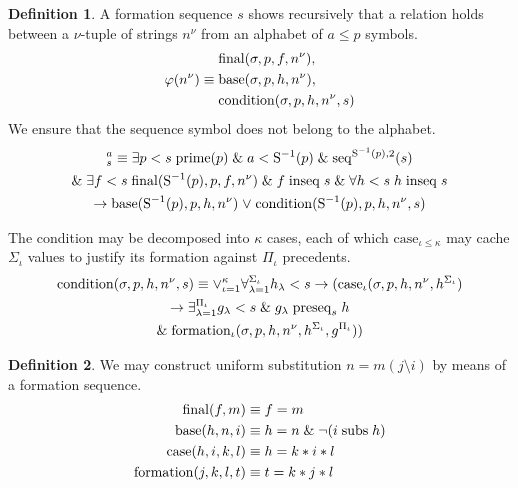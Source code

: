 \documentclass{amsbook}
\newcommand{\univ}[1]{\mathord\forall#1\;}
\newcommand{\exis}[1]{\mathord\exists#1\;}
\newcommand{\then}{\mathrel\rightarrow}
\newcommand{\conj}{\mathrel\&}
\newcommand{\disj}{\mathrel\vee}
\theoremstyle{definition}
\newtheorem{dfn}{Definition}[section]
\begin{document}
\begin{dfn}
    A formation sequence $s$ shows recursively that a relation holds between a $\nu$-tuple of strings $n^\nu$ from an alphabet of $a \leq p$ symbols.
    $$
        \varphi(n^\nu) \equiv \begin{aligned}
             & \mathrm{final}(\sigma, p, f, n^\nu),       \\
             & \mathrm{base}(\sigma, p, h, n^\nu),        \\
             & \mathrm{condition}(\sigma, p, h, n^\nu, s)
        \end{aligned}
    $$
    We ensure that the sequence symbol does not belong to the alphabet.
    \begin{gather*}
        [\varphi(n^\nu)]_s^a \equiv \exis{p < s} \prim(p) \conj a < \suc^{-1}(p) \conj \mathrm{seq}^{\suc^{-1}(p), 2}(s) \\
        \conj \exis{f < s} \final(\suc^{-1}(p), p, f, n^\nu) \conj f \inseq s \conj \univ{h < s} h \inseq s                                                                    \\
        \then \base(\suc^{-1}(p), p, h, n^\nu) \disj \condition(\suc^{-1}(p), p, h, n^\nu, s)
    \end{gather*}

    The condition may be decomposed into $\kappa$ cases, each of which $\mathrm{case}_{\iota\leq\kappa}$ may cache $\Sigma_\iota$ values to justify its formation against $\Pi_\iota$ precedents.
    \begin{gather*}
        \condition(\sigma, p, h, n^\nu, s) \equiv \mathord\vee_{\iota=1}^{\kappa} \forall_{\lambda = 1}^{\Sigma_\iota} h_\lambda < s \then (\mathrm{case}_\iota(\sigma, p, h, n^\nu, h^{\Sigma_\iota})\\
        \then \exists_{\lambda = 1}^{\Pi_\iota}{g_\lambda < s} \conj g_\lambda \preseq_s h\\
        \conj \mathrm{formation}_\iota(\sigma, p, h, n^\nu, h^{\Sigma_\iota}, g^{\Pi_\iota}))
    \end{gather*}
\end{dfn}

\begin{dfn}
    We may construct uniform substitution $n = m(j \setminus i)$ by means of a formation sequence.
    \begin{align*}
        \mathrm{final}(f, m) \equiv\;           & f = m                       \\
        \mathrm{base}(h, n, i) \equiv\;         & h = n \conj \neg(i \subs h) \\
        \mathrm{case}(h, i, k, l) \equiv\;      & h = k * i * l               \\
        \mathrm{formation}(j, k, l, t) \equiv\; & t = k * j * l
    \end{align*}
\end{dfn}
\end{document}

